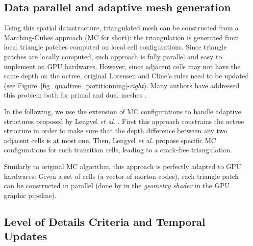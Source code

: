 \documentclass{llncs}
\begin{document}
\subsection{Data parallel and adaptive mesh generation}



Using this spatial datastructure, triangulated mesh can be constructed
from a Marching-Cubes approach \cite{lorensen1987marching} (MC for short): the
triangulation is generated from local triangle patches computed on
local cell configurations. Since triangle patches are locally
computed, such approach is fully parallel and easy to implement on GPU
hardwares. However, since adjacent cells may not have the same depth
on the octree, original Lorensen and Cline's rules need to be
updated (see Figure~\ref{fig_quadtree_partitionning}-\emph{right}). Many authors have addressed this problem both for primal and
dual meshes
\cite{shu1995adaptive,schaefer2004dual,lengyel2010voxel,DBLP:journals/cgf/LewinerMPPL10,DBLP:journals/cvgip/LobelloDD14}.

In the following, we use the extension of MC configurations to handle
adaptive structures proposed by Lengyel \emph{et al.}
\cite{lengyel2010voxel}. First this approach constrains the octree
structure in order to make sure that the depth difference between any
two adjacent cells is at most one. Then, Lengyel \emph{et al.} propose
specific MC configurations for such transition cells,  leading to a
crack-free triangulation.

Similarly to original MC algorithm, this approach is perfectly adapted
to GPU hardwares: Given a set of cells (a vector of morton codes),
each triangle patch can be constructed in parallel (done by 
in the \emph{geometry shader} in the GPU graphic pipeline).

\subsection{Level of Details Criteria and Temporal Updates}
\end{document}

